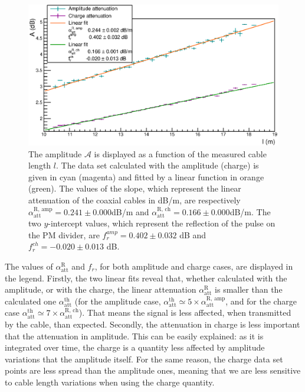 \begin{figure}[h!]
  \centering
  \includegraphics[width=15cm]{commissioning/fig_commissioning/attenuation_length.eps}
  \caption{The amplitude $\mathcal{A}$ is displayed as a function of the measured cable length $l$.
    The data set calculated with the amplitude (charge) is given in cyan (magenta) and fitted by a linear function in orange (green).
    The values of the slope, which represent the linear attenuation of the coaxial cables in dB/m, are respectively $\alpha_{\text{att}}^{\text{R, amp}} = 0.241\pm 0.000$dB/m and $\alpha_{\text{att}}^{\text{R, ch}} = 0.166\pm0.000$dB/m.
    The two $y$-intercept values, which represent the reflection of the pulse on the PM divider, are $f_{r}^{amp} = 0.402\pm 0.032$ dB and $f_{r}^{ch} = -0.020\pm 0.013$ dB.
    \label{fig:attenuation}}
\end{figure}
The values of $\alpha_{\text{att}}^{\text{R}}$ and $f_{r}$, for both amplitude and charge cases, are displayed in the legend.
Firstly, the two linear fits reveal that, whether calculated with the amplitude, or with the charge, the linear attenuation $\alpha_{\text{att}}^{\text{R}}$ is smaller than the calculated one $\alpha_{\text{att}}^{\text{th}}$ (for the amplitude case, $\alpha_{\text{att}}^{\text{th}}\simeq 5\times \alpha_{\text{att}}^{\text{R, amp}}$, and for the charge case $\alpha_{\text{att}}^{\text{th}}\simeq 7\times \alpha_{\text{att}}^{\text{R, ch}}$).
That means the signal is less affected, when transmitted by the cable, than expected.
Secondly, the attenuation in charge is less important that the attenuation in amplitude.
This can be easily explained: as it is integrated over time, the charge is a quantity less affected by amplitude variations that the amplitude itself.
For the same reason, the charge data set points are less spread than the amplitude ones, meaning that we are less sensitive to cable length variations when using the charge quantity.


